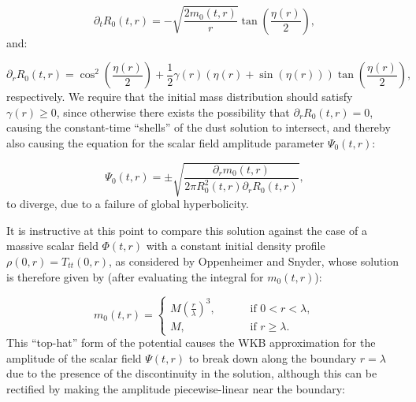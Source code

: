 \documentclass{article}
\begin{document}
\begin{equation}
\partial_t R_0 \left( t, r \right) = - \sqrt{\frac{2 m_0 \left( t, r \right)}{r}} \tan \left( \frac{\eta \left( r \right)}{2} \right),
\end{equation}
and:

\begin{equation}
\partial_r R_0 \left( t, r \right) = \cos^2 \left( \frac{\eta \left( r \right)}{2} \right) + \frac{1}{2} \gamma \left( r \right) \left( \eta \left( r \right) + \sin \left( \eta \left( r \right) \right) \right) \tan \left( \frac{\eta \left( r \right)}{2} \right),
\end{equation}
respectively. We require that the initial mass distribution should satisfy ${\gamma \left( r \right) \geq 0}$, since otherwise there exists the possibility that ${\partial_r R_0 \left( t, r \right) = 0}$, causing the constant-time ``shells'' of the dust solution to intersect, and thereby also causing the equation for the scalar field amplitude parameter ${\Psi_0 \left( t, r \right)}$:

\begin{equation}
\Psi_0 \left( t, r \right) = \pm \sqrt{\frac{\partial_r m_0 \left( t, r \right)}{2 \pi R_{0}^{2} \left( t, r \right) \partial_r R_0 \left( t, r \right)}},
\end{equation}
to diverge, due to a failure of global hyperbolicity.

It is instructive at this point to compare this solution against the case of a massive scalar field ${\Phi \left( t, r \right)}$ with a constant initial density profile ${\rho \left( 0, r \right) = T_{t t} \left( 0, r \right)}$, as considered by Oppenheimer and Snyder\cite{oppenheimer}, whose solution is therefore given by (after evaluating the integral for ${m_0 \left( t, r \right)}$):

\begin{equation}
m_0 \left( t, r \right) = \begin{cases}
M \left( \frac{r}{\lambda} \right)^3, \qquad & \text{ if } 0 < r < \lambda,\\
M, \qquad &\text{ if } r \geq \lambda.
\end{cases}
\end{equation}
This ``top-hat'' form of the potential causes the WKB approximation for the amplitude of the scalar field ${\Psi \left( t, r \right)}$ to break down along the boundary ${r = \lambda}$ due to the presence of the discontinuity in the solution, although this can be rectified by making the amplitude piecewise-linear near the boundary:
\end{document}
